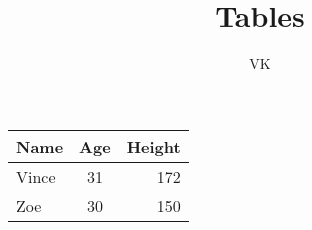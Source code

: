 \documentclass{article}
\title{Tables}
\author{VK}
\begin{document}
\maketitle

\begin{tabular}{|l|c|r|}
    \hline
    Name & Age & Height\\
    \hline
    Vince& 31  & 172\\
    \hline
    Zoe  & 30  & 150\\
    \hline
\end{tabular}
\end{document}
